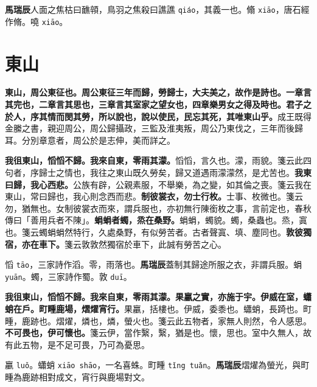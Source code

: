 \begin{quoting}\textbf{馬瑞辰}人面之焦枯曰䩌顇，鳥羽之焦殺曰譙譙 \texttt{qiáo}，其義一也。翛 \texttt{xiāo}，唐石經作脩。嘵 \texttt{xiāo}。\end{quoting}

\section{東山}


\textbf{東山，周公東征也。周公東征三年而歸，勞歸士，大夫美之，故作是詩也。一章言其完也，二章言其思也，三章言其室家之望女也，四章樂男女之得及時也。君子之於人，序其情而閔其勞，所以說也，說以使民，民忘其死，其唯東山乎。}{\footnotesize 成王既得金縢之書，親迎周公，周公歸攝政，三監及淮夷叛，周公乃東伐之，三年而後歸耳。分別章意者，周公於是志伸，美而詳之。}

\textbf{我徂東山，慆慆不歸。我來自東，零雨其濛。}{\footnotesize 慆慆，言久也。濛，雨貌。箋云此四句者，序歸士之情也，我往之東山既久勞矣，歸又道遇雨濛濛然，是尤苦也。}\textbf{我東曰歸，我心西悲。}{\footnotesize 公族有辟，公親素服，不舉樂，為之變，如其倫之喪。箋云我在東山，常曰歸也，我心則念西而悲。}\textbf{制彼裳衣，勿士行枚。}{\footnotesize 士事、枚微也。箋云勿，猶無也。女制彼裳衣而來，謂兵服也，亦初無行陳銜枚之事，言前定也，春秋傳曰「善用兵者不陳」。}\textbf{蜎蜎者蠋，烝在桑野。}{\footnotesize 蜎蜎，蠋貌。蠋，桑蟲也。烝，寘也。箋云蠋蜎蜎然特行，久處桑野，有似勞苦者。古者聲寘、填、塵同也。}\textbf{敦彼獨宿，亦在車下。}{\footnotesize 箋云敦敦然獨宿於車下，此誠有勞苦之心。}

\begin{quoting}慆 \texttt{tāo}，三家詩作滔。零，雨落也。\textbf{馬瑞辰}蓋制其歸途所服之衣，非謂兵服。蜎 \texttt{yuān}。蠋，三家詩作蜀。敦 \texttt{duī}。\end{quoting}

\textbf{我徂東山，慆慆不歸。我來自東，零雨其濛。果臝之實，亦施于宇。伊威在室，蠨蛸在戶。町畽鹿場，熠燿宵行。}{\footnotesize 果臝，括樓也。伊威，委黍也。蠨蛸，長踦也。町畽，鹿跡也。熠燿，燐也，燐，螢火也。箋云此五物者，家無人則然，令人感思。}\textbf{不可畏也，伊可懷也。}{\footnotesize 箋云伊，當作繄，繄，猶是也。懷，思也。室中久無人，故有此五物，是不足可畏，乃可為憂思。}

\begin{quoting}臝 \texttt{luǒ}。蠨蛸 \texttt{xiāo shāo}，一名喜蛛。町畽 \texttt{tǐng tuǎn}。\textbf{馬瑞辰}熠燿為螢光，與町畽為鹿跡相對成文，宵行與鹿場對文。\end{quoting}

